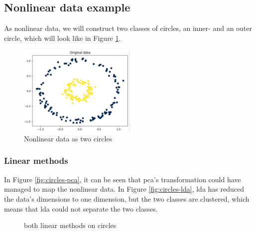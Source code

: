 \subsection{Nonlinear data example}\label{subsec:nonlinear-data-example}
As nonlinear data, we will construct two classes of circles, an inner- and an outer circle, which will look like in Figure \ref{fig:circles}.

\begin{figure}[htb!]
    \centering
    \includegraphics[width=0.5\textwidth]{figures/theory-example-figures/fig-circles.png}
    \caption{Nonlinear data as two circles}
    \label{fig:circles}
\end{figure}

\subsubsection{Linear methods}\label{subsubsec:linear-methods-on-circles}
In Figure \ref{fig:circles-pca}, it can be seen that \gls{pca}'s transformation could have managed to map the nonlinear data. In Figure \ref{fig:circles-lda}, \gls{lda} has reduced the data's dimensions to one dimension, but the two classes are clustered, which means that \gls{lda} could not separate the two classes.

\begin{figure}
    \centering
    \qquad
    \caption{both linear methods on circles}
    \label{fig:linear-methods-circles}
\end{figure}

